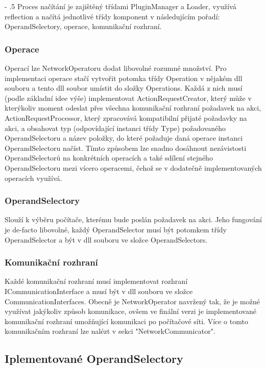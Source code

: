 \documentclass[12pt]{article}
\makeatletter
\renewcommand\paragraph{%
    \@startsection{paragraph}{4}{0mm}%
       {-\baselineskip}%
       {.5\baselineskip}%
       {\normalfont\normalsize\bfseries}}
\makeatother
\begin{document}
\paragraph{Proces načítání} je zajištěný třídami PluginManager a Loader, využívá reflection a načítá jednotlivé třídy komponent v následujícím pořadí: OperandSelectory, operace, komunikační rozhraní.

\subsubsection{Operace}
Operací lze NetworkOperatoru dodat libovolné rozumné množství. Pro implementaci operace stačí vytvořit potomka třídy Operation v nějakém dll souboru a tento dll soubor umístit do složky Operations. Každá z nich musí (podle základní idee výše) implementovat ActionRequestCreator, který může v kterýkoliv moment odeslat přes všechna komunikační rozhraní požadavek na akci, ActionRequestProcessor, který zpracovává kompatibilní přijaté požadavky na akci, a obsahovat typ (odpovídající instanci třídy Type) požadovaného OperandSelectoru a název položky, do které požaduje daná operace instanci OperandSelectoru načíst. Tímto způsobem lze snadno dosáhnout nezávistosti OperandSelectorů na konkrétních operacích a také sdílení stejného OperandSelectoru mezi vícero operacemi, čehož se v dodatečně implementovaných operacích využívá.

\subsubsection{OperandSelectory}
Slouží k výběru počítače, kterému bude poslán požadavek na akci. Jeho fungování je de-facto libovolné, každý OperandSelector musí být potomkem třídy OperandSelector a být v dll souboru ve složce OperandSelectors.

\subsubsection{Komunikační rozhraní}
Každé komunikační rozhraní musí implementovat rozhraní ICommunicationInterface a musí být v dll souboru ve složce CommunicationInterfaces. Obecně je NetworkOperator navržený tak, že je možné využívat jakýkoliv způsob komunikace, ovšem ve finální verzi je implementované komunikační rozhraní umožňující komunikaci po počítačové síti. Více o tomto komunikačním rozhraní lze nalézt v sekci "NetworkCommunicator".

\subsection{Iplementované OperandSelectory}
\end{document}
